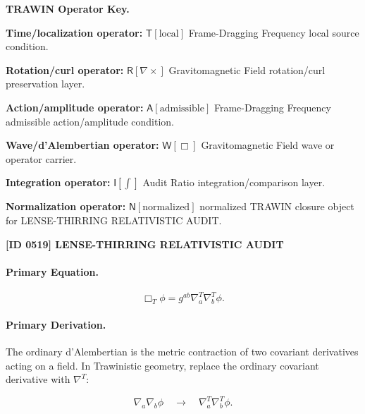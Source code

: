 \par\vspace{0.45\baselineskip}
\noindent\begin{minipage}[t]{\linewidth}
\begingroup
\small
\raggedright
\textbf{TRAWIN Operator Key.}\par
\noindent\textbf{Time/localization operator:} $\mathsf{T}\!\left[\mathrm{local}\right]$ Frame-Dragging Frequency local source condition.\par
\noindent\textbf{Rotation/curl operator:} $\mathsf{R}\!\left[\nabla\times\right]$ Gravitomagnetic Field rotation/curl preservation layer.\par
\noindent\textbf{Action/amplitude operator:} $\mathsf{A}\!\left[\mathrm{admissible}\right]$ Frame-Dragging Frequency admissible action/amplitude condition.\par
\noindent\textbf{Wave/d'Alembertian operator:} $\mathsf{W}\!\left[\Box\right]$ Gravitomagnetic Field wave or operator carrier.\par
\noindent\textbf{Integration operator:} $\mathsf{I}\!\left[\int\right]$ Audit Ratio integration/comparison layer.\par
\noindent\textbf{Normalization operator:} $\mathsf{N}\!\left[\mathrm{normalized}\right]$ normalized TRAWIN closure object for LENSE-THIRRING RELATIVISTIC AUDIT.\par
\endgroup
\end{minipage}

\clearpage
\noindent\textbf{[ID 0519] LENSE-THIRRING RELATIVISTIC AUDIT}\par
\vspace{0.35em}
\paragraph{Primary Equation.}
\begin{equation}
\Box_T\phi
=
g^{ab}
\nabla^{T}_{a}
\nabla^{T}_{b}
\phi .
\end{equation}

\paragraph{Primary Derivation.}
The ordinary d'Alembertian is the metric contraction of two covariant derivatives acting on a field.  
In Trawinistic geometry, replace the ordinary covariant derivative with $\nabla^T$:

\begin{equation}
\nabla_a\nabla_b\phi
\quad\longrightarrow\quad
\nabla^T_a\nabla^T_b\phi .
\end{equation}


